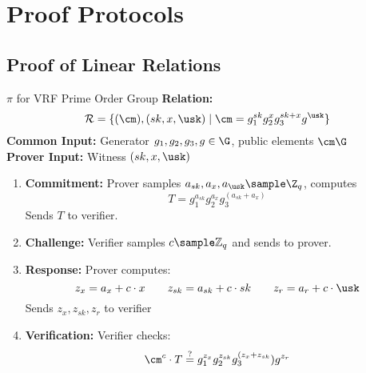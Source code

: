 \newpage

\section{Proof Protocols}
\subsection{Proof of Linear Relations}

\begin{protocol}{$\pi$ for VRF Prime Order Group}{}\label{pok-linear-relation}
\textbf{Relation: }
\[
\mathcal{R} = \{(\cm), (sk, x, \usk) \mid \cm = g_1^{sk}g_2^{x}g_3^{sk + x}g^{\usk}\}
\]
\textbf{Common Input:} Generator $g_1,g_2,g_3, g \in \G$, public elements $\cm \G$\\
\textbf{Prover Input:} Witness $(sk, x, \usk)$
\begin{enumerate}
    \item \textbf{Commitment:} Prover samples $a_{sk}, a_{x}, a_{\usk} \sample \Z_q$, computes 
    \[
    T = g_1^{a_{sk}}g_2^{a_x} g_3^{(a_{sk} + a_x)} 
    \]
    Sends $T$ to verifier.
    
    \item \textbf{Challenge:} Verifier samples $c \sample \mathbb{Z}_q$ and sends to prover.
    
    \item \textbf{Response:} Prover computes:
    \[
    z_{x} = a_x + c \cdot x \qquad z_{sk} = a_{sk} + c \cdot sk \qquad z_r = a_r + c \cdot \usk
    \]
    Sends $z_{x}, z_{sk}, z_{r}$ to verifier
    
    \item \textbf{Verification:} Verifier checks:
    \[
    \cm^c \cdot T \stackrel{?}{=} g_1^{z_{x}} g_2^{z_{sk}} g_3^{(z_x + z_{sk}}) g^{z_r}
    \]
\end{enumerate}
\end{protocol}
